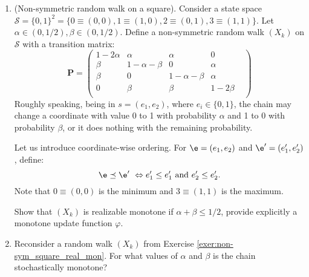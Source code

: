\documentclass[a4paper,12pt]{article}
\begin{document}
\begin{enumerate}
\item\label{exer:non-sym_square_real_mon} (Non-symmetric random walk on a square).
Consider a state space  $\mathcal{S}=\{0,1\}^2 = \{0 \equiv (0,0), 1 \equiv (1,0), 2 \equiv (0,1), 3 \equiv (1,1)\}$.
Let $\alpha\in(0,1/2), \beta\in(0,1/2)$. Define a non-symmetric random walk $(X_k)$ on $\mathcal{S}$ with a transition matrix:
$$
\mathbf{P}=\left(
\begin{array}{ccccc}
1-2\alpha & \alpha & \alpha & 0 \\
\beta& 1-\alpha-\beta & 0  & \alpha \\
\beta& 0& 1-\alpha-\beta & \alpha \\
0&\beta& \beta& 1-2\beta & \\
\end{array}\right)
$$
Roughly speaking, being in $s=(e_1,e_2)$, where $e_i\in\{0,1\}$, the chain may change a coordinate with value
0 to 1 with probability $\alpha$ and 1 to 0 with probability $\beta$, or it does nothing with the remaining probability.

Let us introduce coordinate-wise ordering. For $\e = (e_1, e_2)$ and $\e' = (e'_1, e'_2)$, define:
$$\e \preceq \e' \ \Leftrightarrow e_1' \leq e_1' \textrm{ and } e_2' \leq e_2'.$$
Note that $0\equiv (0,0)$ is the minimum and $3\equiv (1,1)$ is the maximum.

\medskip\par\noindent
Show that $(X_k)$ is realizable monotone if $\alpha+\beta\leq 1/2$, provide explicitly a monotone update function $\varphi$.

\item Reconsider a random walk $(X_k)$ from Exercise \ref{exer:non-sym_square_real_mon}.
For what values of $\alpha$ and $\beta$ is the chain stochastically monotone?

\end{enumerate}
\end{document}
